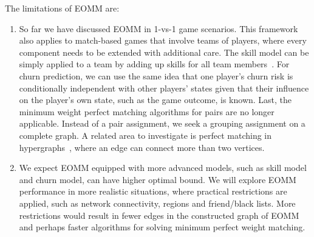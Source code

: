 The limitations of EOMM are:
\begin{enumerate}
\item So far we have discussed EOMM in 1-vs-1 game scenarios. This framework also applies to match-based games that involve teams of players, where every component needs to be extended with additional care. The skill model can be simply applied to a team by adding up skills for all team members~\cite{herbrich:trueskill}. For churn prediction, we can use the same idea that one player's churn risk is conditionally independent with other players' states given that their influence on the player's own state, such as the game outcome, is known. Last, the minimum weight perfect matching algorithms for pairs are no longer applicable. Instead of a pair assignment, we seek a grouping assignment on a complete graph. A related area to investigate is perfect matching in hypergraphs~\cite{berge1984hypergraphs}, where an edge can connect more than two vertices. 


\item We expect EOMM equipped with more advanced models, such as skill model and churn model, can have higher optimal bound. We will explore EOMM performance in more realistic situations, where practical restrictions are applied, such as network connectivity, regions and friend/black lists. More restrictions would result in fewer edges in the constructed graph of EOMM and perhaps faster algorithms for solving minimum perfect weight matching. 
\end{enumerate}



